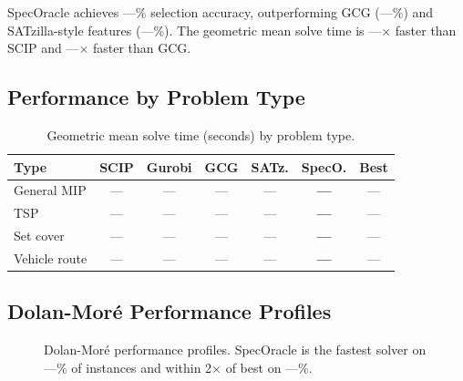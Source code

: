 \documentclass[11pt]{article}
\begin{document}
SpecOracle achieves ---\% selection accuracy, outperforming GCG (---\%) and SATzilla-style features (---\%). The geometric mean solve time is ---$\times$ faster than SCIP and ---$\times$ faster than GCG.

\subsection{Performance by Problem Type}

\begin{table}[t]
\centering
\caption{Geometric mean solve time (seconds) by problem type.}
\begin{tabular}{lcccccc}
\toprule
\textbf{Type} & \textbf{SCIP} & \textbf{Gurobi} & \textbf{GCG} & \textbf{SATz.} & \textbf{SpecO.} & \textbf{Best} \\
\midrule
General MIP & --- & --- & --- & --- & \textbf{---} & --- \\
TSP & --- & --- & --- & --- & \textbf{---} & --- \\
Set cover & --- & --- & --- & --- & \textbf{---} & --- \\
Vehicle route & --- & --- & --- & --- & \textbf{---} & --- \\
\bottomrule
\end{tabular}
\end{table}

\subsection{Dolan-Mor\'e Performance Profiles}

\begin{figure}[t]
\centering
{}
\caption{Dolan-Mor\'e performance profiles. SpecOracle is the fastest solver on ---\% of instances and within 2$\times$ of best on ---\%.}
\label{fig:profile}
\end{figure}
\end{document}
